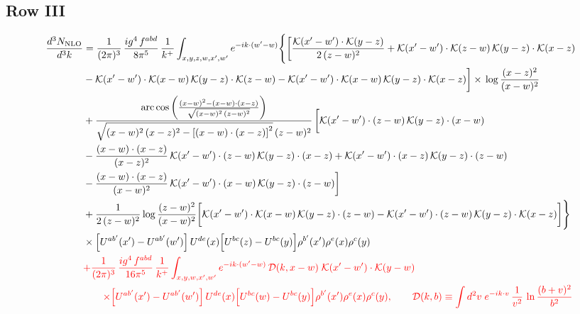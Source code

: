 \documentclass[9pt]{article}
\numberwithin{equation}{section}
\newcommand{\chg}[1]{{\color{red}#1}}
\begin{document}
\subsection{Row III}
\begin{align}
\frac{d^{3}N_{\rm NLO}}{d^{3}k} &=\frac{1}{(2\pi)^{3}}\,\frac{ig^{4}\,f^{abd}}{8\pi^{5}}\,\frac{1}{k^{+}}\int_{x,y,z,w,x',w'}e^{-ik\cdot(w'-w)}\Bigg\{\bigg[\frac{\mathcal{K}(x'-w')\cdot\mathcal{K}(y-z)}{2\,(z-w)^{2}}+\mathcal{K}(x'-w')\cdot\mathcal{K}(z-w)\,\mathcal{K}(y-z)\cdot\mathcal{K}(x-z)\notag \\
&-\mathcal{K}(x'-w')\cdot\mathcal{K}(x-w)\,\mathcal{K}(y-z)\cdot\mathcal{K}(z-w)-\mathcal{K}(x'-w')\cdot\mathcal{K}(x-w)\,\mathcal{K}(y-z)\cdot\mathcal{K}(x-z)\bigg]\times\, \log\frac{(x-z)^{2}}{(x-w)^{2}}\notag \\
&+\frac{\mathrm{arc\,cos}\left(\frac{(x-w)^{2}-(x-w)\cdot (x-z)}{\sqrt{(x-w)^{2}\,(z-w)^{2}}}\right)}{\sqrt{(x-w)^{2}\,(x-z)^{2}-\left[(x-w)\cdot (x-z)\right]^{2}}\,(z-w)^{2}}\,\bigg[\mathcal{K}(x'-w')\cdot(z-w)\,\mathcal{K}(y-z)\cdot(x-w)\notag \\ & -\frac{(x-w)\cdot(x-z)}{(x-z)^{2}}\,\mathcal{K}(x'-w')\cdot(z-w)\,\mathcal{K}(y-z)\cdot(x-z)+\mathcal{K}(x'-w')\cdot(x-z)\,\mathcal{K}(y-z)\cdot(z-w)\notag \\ & -\frac{(x-w)\cdot(x-z)}{(x-w)^{2}}\,\mathcal{K}(x'-w')\cdot(x-w)\,\mathcal{K}(y-z)\cdot(z-w)\bigg]\notag \\
&+\frac{1}{2\,(z-w)^{2}}\log\frac{(z-w)^{2}}{(x-w)^{2}}\bigg[\mathcal{K}(x'-w')\cdot\mathcal{K}(x-w)\,\mathcal{K}(y-z)\cdot(z-w)-\mathcal{K}(x'-w')\cdot(z-w)\,\mathcal{K}(y-z)\cdot\mathcal{K}(x-z)\bigg]\Bigg\}\notag\\
&\times\Big[U^{ab'}(x')-U^{ab'}(w')\Big]\,U^{de}(x)\Big[U^{bc}(z)-U^{bc}(y)\Big]\rho^{b'}(x')\rho^{e}(x)\rho^{c}(y)\notag\\
&\chg{+\frac{1}{(2\pi)^{3}}\,\frac{ig^{4}\,f^{abd}}{16\pi^{5}}\,\frac{1}{k^{+}}\int_{x,y,w,x',w'}e^{-ik\cdot(w'-w)}\,\mathcal{D}(k,x-w)\;\mathcal{K}(x'-w')\cdot\mathcal{K}(y-w)}\notag\\
&\chg{\qquad\times\Big[U^{ab'}(x')-U^{ab'}(w')\Big]\,U^{de}(x)\Big[U^{bc}(w)-U^{bc}(y)\Big]\rho^{b'}(x')\rho^{e}(x)\rho^{c}(y),\qquad \mathcal{D}(k,b)\equiv\int d^{2}v\;e^{-ik\cdot v}\,\frac{1}{v^{2}}\,\ln\frac{(b+v)^{2}}{b^{2}}}
\end{align}
\end{document}
